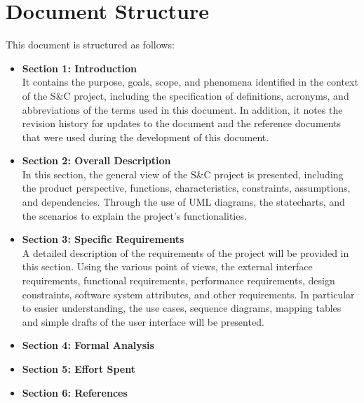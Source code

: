\section{Document Structure}\label{sec:structure}
This document is structured as follows:
\begin{itemize}
    \item \textbf{Section 1: Introduction} 
    \\It contains the purpose, goals, scope, and phenomena identified in the context of the S\&C project, 
    including the specification of definitions, acronyms, and abbreviations of the terms used in this document. In addition, it notes the revision 
    history for updates to the document and the reference documents that were used during the development of this document.
    \item \textbf{Section 2: Overall Description}
    \\ In this section, the general view of the S\&C project is presented, including the product perspective, functions, characteristics, constraints,
    assumptions, and dependencies. Through the use of UML diagrams, the statecharts, and the scenarios to explain the project's functionalities.
    \item \textbf{Section 3: Specific Requirements}
    \\ A detailed description of the requirements of the project will be provided in this section. Using the various point of views, the external   
    interface requirements, functional requirements, performance requirements, design constraints, software system attributes, and other requirements.
    In particular to easier understanding, the use cases, sequence diagrams, mapping tables and simple drafts of the user interface will be presented.
    \item \textbf{Section 4: Formal Analysis}
    \item \textbf{Section 5: Effort Spent}
    \item \textbf{Section 6: References}
\end{itemize}